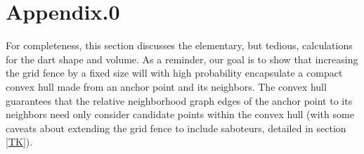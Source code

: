 \documentclass[a4paper,fleqn]{cas-dc}
\begin{document}
%
%
%
%

\appendix
\section{Appendix.0}

For completeness, this section discusses the elementary, but tedious, calculations
for the dart shape and volume.
As a reminder, our goal is to show that increasing the grid fence by a fixed size
will with high probability encapsulate a compact convex hull made from an anchor point and its neighbors.
The convex hull guarantees that the relative neighborhood graph edges of the anchor point to
its neighbors need only consider candidate points within the convex hull (with some caveats
about extending the grid fence to include saboteurs, detailed in section \ref{TK}).
\end{document}
